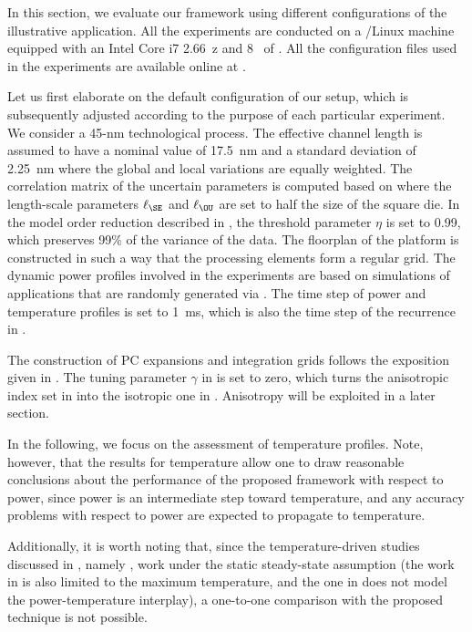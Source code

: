 In this section, we evaluate our framework using different configurations of the
illustrative application. All the experiments are conducted on a /Linux
machine equipped with an Intel Core i7 2.66~z and 8~ of .
All the configuration files used in the experiments are available online at
\cite{eslab2014b}.

Let us first elaborate on the default configuration of our setup, which is
subsequently adjusted according to the purpose of each particular experiment. We
consider a 45-nm technological process. The effective channel length is assumed
to have a nominal value of 17.5~nm \cite{ptm} and a standard deviation of
2.25~nm where the global and local variations are equally weighted. The
correlation matrix of the uncertain parameters is computed based on
 where the length-scale parameters $\ell_\SE$ and
$\ell_\OU$ are set to half the size of the square die. In the model order
reduction described in , the threshold
parameter $\eta$ is set to 0.99, which preserves 99\% of the variance of the
data. The floorplan of the platform is constructed in such a way that the
processing elements form a regular grid. The dynamic power profiles involved in
the experiments are based on simulations of applications that are randomly
generated via  \cite{dick1998}. The time step \dt of power and
temperature profiles is set to 1~ms, which is also the time step of the
recurrence in .

The construction of \ac{PC} expansions and integration grids follows the
exposition given in . The tuning parameter $\gamma$ in
 is set to zero, which turns the anisotropic
index set in  into the isotropic one in
. Anisotropy will be exploited in a later
section.

In the following, we focus on the assessment of temperature profiles. Note,
however, that the results for temperature allow one to draw reasonable
conclusions about the performance of the proposed framework with respect to
power, since power is an intermediate step toward temperature, and any accuracy
problems with respect to power are expected to propagate to temperature.

Additionally, it is worth noting that, since the temperature-driven studies
discussed in , namely \cite{huang2009a, juan2011, juan2012,
lee2013}, work under the static steady-state assumption (the work in
\cite{juan2011} is also limited to the maximum temperature, and the one in
\cite{huang2009a} does not model the power-temperature interplay), a one-to-one
comparison with the proposed technique is not possible.

